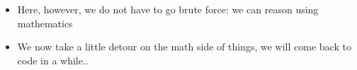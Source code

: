 \documentclass[aspectratio=169]{beamer}\usepackage[]{graphicx}\usepackage[]{xcolor}
\begin{document}
\begin{frame}
\begin{itemize}
\item Here, however, we do not have to go brute force: we can reason using mathematics
\item We now take a little detour on the math side of things, we will come back to code in a while..
\end{itemize}
\end{frame}








\end{document}
